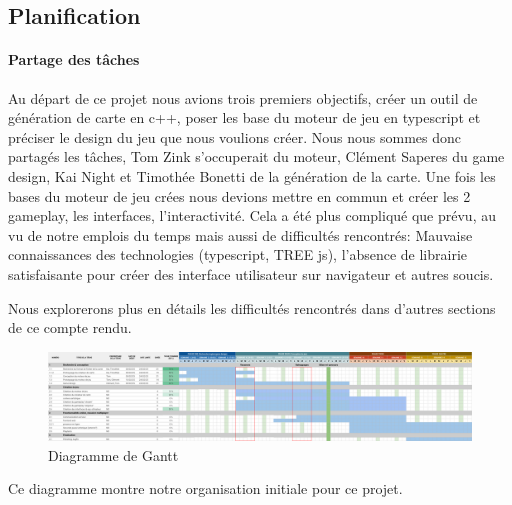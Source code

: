 

\subsection{Planification}

\paragraph{Partage des tâches}
Au départ de ce projet nous avions trois premiers objectifs, créer un outil de génération de carte en c++, poser les base du moteur de jeu en typescript et préciser le design du jeu que nous voulions créer. Nous nous sommes donc partagés les tâches, Tom Zink s’occuperait du moteur, Clément Saperes du game design, Kai Night et Timothée Bonetti de la génération de la carte.
Une fois les bases du moteur de jeu crées nous devions mettre en commun et créer les 2 gameplay, les interfaces, l'interactivité.
Cela a été plus compliqué que prévu, au vu de notre emplois du temps mais aussi de difficultés rencontrés: Mauvaise connaissances des technologies (typescript, TREE js), l'absence de librairie satisfaisante pour créer des interface utilisateur sur navigateur et autres soucis.

Nous explorerons plus en détails les difficultés rencontrés dans d'autres sections de ce compte rendu.

\begin{figure}[!h]
    \centering
    \includegraphics[width=0.99\linewidth]{images/gantt.png}
    \caption{Diagramme de Gantt}
    \label{fig:enter-label}
\end{figure}

Ce diagramme montre notre organisation initiale pour ce projet.